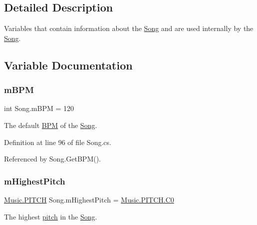 \subsection{Detailed Description}
Variables that contain information about the \hyperlink{class_song}{Song} and are used internally by the \hyperlink{class_song}{Song}. 

\subsection{Variable Documentation}
\mbox{\label{group___song_priv_var_ga3341fbbd9c0c58fe6514623e6b6c5a1e}} 
\subsubsection{\texorpdfstring{m\+B\+PM}{mBPM}}
{\footnotesize\ttfamily int Song.\+m\+B\+PM = 120\hspace{0.3cm}{\ttfamily [private]}}



The default \hyperlink{group___audio_DefBPM}{B\+PM} of the \hyperlink{class_song}{Song}. 



Definition at line 96 of file Song.\+cs.



Referenced by Song.\+Get\+B\+P\+M().

\mbox{\label{group___song_priv_var_ga2dcd39d9add609e9df56a94057441dcc}} 
\subsubsection{\texorpdfstring{m\+Highest\+Pitch}{mHighestPitch}}
{\footnotesize\ttfamily \hyperlink{group___music_enums_ga508f69b199ea518f935486c990edac1d}{Music.\+P\+I\+T\+CH} Song.\+m\+Highest\+Pitch = \hyperlink{group___music_enums_gga508f69b199ea518f935486c990edac1da9c5959e6f08f10d0edbadf5be1f33c53}{Music.\+P\+I\+T\+C\+H.\+C0}\hspace{0.3cm}{\ttfamily [private]}}



The highest \hyperlink{group___music_enums_ga508f69b199ea518f935486c990edac1d}{pitch} in the \hyperlink{class_song}{Song}. 



